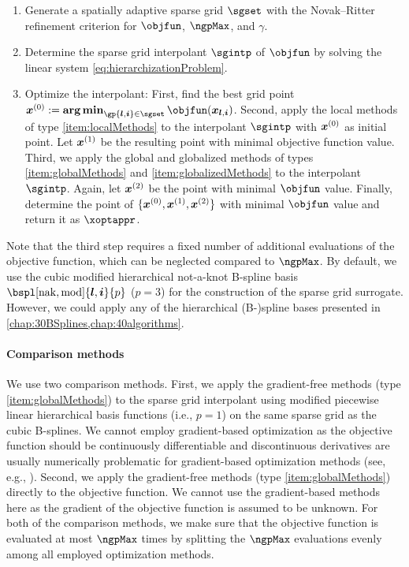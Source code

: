 \begin{enumerate}
  \item
  Generate a spatially adaptive sparse grid $\sgset$
  with the Novak--Ritter refinement criterion
  for $\objfun$, $\ngpMax$, and $\gamma$.
  
  \item
  Determine the sparse grid interpolant $\sgintp$ of $\objfun$
  by solving the linear system \eqref{eq:hierarchizationProblem}.
  
  \item
  Optimize the interpolant:
  First, find the best grid point
  $\*x^{(0)} := \vecargmin_{\gp{\*l,\*i} \in \sgset} \objfun(\*x_{\*l,\*i})$.
  Second, apply the local methods of type \ref{item:localMethods}
  to the interpolant $\sgintp$ with ${\boldsymbol{x}}^{(0)}$ as initial point.
  Let ${\boldsymbol{x}}^{(1)}$ be the resulting point with minimal objective function value.
  Third, we apply the global and globalized methods
  of types \ref{item:globalMethods} and \ref{item:globalizedMethods}
  to the interpolant $\sgintp$.
  Again, let ${\boldsymbol{x}}^{(2)}$ be the point with
  minimal $\objfun$ value.
  Finally, determine the point of $\{{\boldsymbol{x}}^{(0)}, {\boldsymbol{x}}^{(1)}, {\boldsymbol{x}}^{(2)}\}$
  with minimal $\objfun$ value and return it as $\xoptappr$.
\end{enumerate}

\noindent
Note that the third step requires a fixed number of additional
evaluations of the objective function,
which can be neglected compared to $\ngpMax$.
By default, we use the cubic modified hierarchical not-a-knot B-spline basis
$\bspl[\nak,\modified]{\*l,\*i}{p}$ ($p = 3$)
for the construction of the sparse grid surrogate.
However, we could apply any of the hierarchical (B-)spline bases presented in
\cref{chap:30BSplines,chap:40algorithms}.

\paragraph{Comparison methods}

We use two comparison methods.
First, we apply the gradient-free methods
(type \ref{item:globalMethods}) to the sparse grid interpolant
using modified piecewise linear hierarchical basis functions
(i.e., $p = 1$) on the same sparse grid as the cubic B-splines.
We cannot employ gradient-based optimization as the objective function
should be continuously differentiable and
discontinuous derivatives are usually numerically problematic
for gradient-based optimization methods
(see, e.g., \cite{Huebner14Mehrdimensionale}).
Second, we apply the gradient-free methods
(type \ref{item:globalMethods}) directly to the objective function.
We cannot use the gradient-based methods here as the gradient of the
objective function is assumed to be unknown.
For both of the comparison methods,
we make sure that the objective function is evaluated at most $\ngpMax$ times
by splitting the $\ngpMax$ evaluations
evenly among all employed optimization methods.

